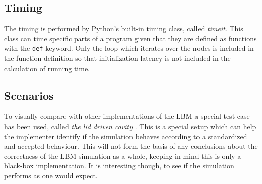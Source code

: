 \subsection{Timing}
The timing is performed by Python's built-in timing class, called \textit{timeit}. This class can time specific parts of a program given that they are defined as functions with the \texttt{def} keyword. Only the loop which iterates over the nodes is included in the function definition so that initialization latency is not included in the calculation of running time.

\subsection{Scenarios}
To visually compare with other implementations of the LBM a special test case has been used, called \emph{the lid driven cavity} \cite{lid}. This is a special setup which can help the implementer identify if the simulation behaves according to a standardized and accepted behaviour. This will not form the basis of any conclusions about the correctness of the LBM simulation as a whole, keeping in mind this is only a black-box implementation. It is interesting though, to see if the simulation performs as one would expect.